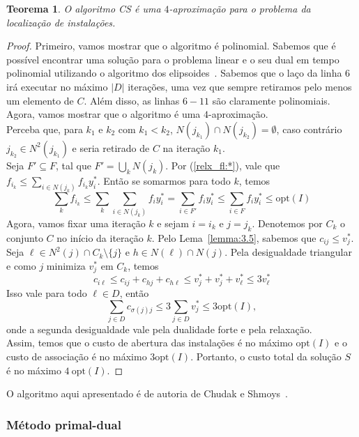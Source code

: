 \documentclass[12pt]{article}
\newcommand{\opt}{\ensuremath{\mathrm{opt}}}
\newtheorem{theorem}{Teorema}[section]
\begin{document}
\begin{theorem}
    O algoritmo {\sc CS} é uma $4$-aproximação para o problema da localização de instalações.
\end{theorem}
\begin{proof}
    Primeiro, vamos mostrar que o algoritmo é polinomial. Sabemos que é possível encontrar uma solução para o problema linear e o seu dual em tempo polinomial utilizando o algoritmo dos elipsoides~\cite{Kha79}. Sabemos que o laço da linha 6 irá executar no máximo $|D|$ iterações, uma vez que sempre retiramos pelo menos um elemento de $C$. Além disso, as linhas $6-11$ são claramente polinomiais.
    Agora, vamos mostrar que o algoritmo é uma $4$-aproximação.\\
    Perceba que, para $k_1$ e $k_2$ com $k_1 < k_2$, $N(j_{k_1})\cap N(j_{k_2}) = \emptyset$, caso contrário $j_{k_2} \in N^2(j_{k_1})$ e seria retirado de $C$ na iteração $k_1$.\\
    Seja $F' \subseteq F$, tal que $F' = \bigcup_k N(j_k)$.
    Por (\ref{relx_fl:*}), vale que $f_{i_k} \leq \sum_{i \in N(j_k)}f_{i_k}y^*_{i}$. Então se somarmos para todo $k$, temos
    \[ \sum_kf_{i_k} \leq \sum_k \sum_{i \in N(j_k)}f_{i}y^*_{i} = \sum_{i \in F'}f_{i}y^*_{i} \leq \sum_{i \in F}f_{i}y^*_{i} \leq \opt(I)\]
    Agora, vamos fixar uma iteração $k$ e sejam $i = i_k$ e $j = j_k$. Denotemos por $C_k$ o conjunto $C$ no início da iteração $k$. Pelo Lema~\ref{lemma:3.5}, sabemos que $c_{ij} \leq v^*_j$. Seja $\ell \in N^2(j) \cap C_k \setminus \{j\}$ e $h \in N(\ell) \cap N(j)$. Pela desigualdade triangular e como $j$ minimiza $v^*_j$ em $C_k$, temos
    \[ c_{i\ell} \leq c_{ij} + c_{hj} + c_{h\ell} \leq v_j^* + v_j^* + v_{\ell}^* \leq 3 v_{\ell}^*
        \]
    Isso vale para todo $\ell \in D$, então
    \[\sum_{j\in D} c_{\sigma(j)j} \leq 3 \sum_{j \in D} v^*_j \leq 3\opt(I),\]
    onde a segunda desigualdade vale pela dualidade forte e pela relaxação. \\
    Assim, temos que o custo de abertura das instalações é no máximo $\opt(I)$ e o custo de associação é no máximo $3\opt(I)$. Portanto, o custo total da solução $S$ é no máximo $4~\opt(I)$.
\end{proof}
O algoritmo aqui apresentado é de autoria de Chudak e Shmoys~\cite{Chudak2003}.

\newpage
\subsubsection{Método primal-dual}
\end{document}
